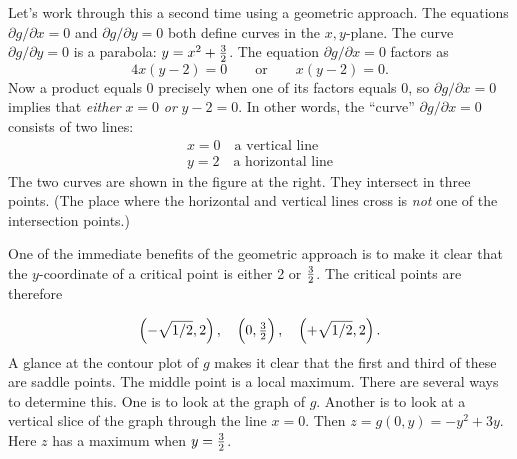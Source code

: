 {{{{        Let's work through this a second time using a geometric approach.  The equations ${\partial g/\partial x} = 0$ and ${\partial g/\partial y} = 0$ both define curves in the $x, y$-plane.  The curve ${\partial g/\partial y} = 0$ is a parabola: $y = x^2 + {\textstyle {3 \over 2}}$.  The equation ${\partial g/\partial x} = 0$ factors as
        \[
4 x ( y - 2) = 0 \qquad \mbox{or} \qquad x ( y - 2 ) = 0.
\]
Now a product equals 0 precisely when one of its factors equals 0, so ${\partial g/\partial x} = 0$ implies that {\em either\/} $x = 0$ {\em or\/} 
$y - 2 = 0$.  In other words, the ``curve'' ${\partial g/\partial x} = 0$ consists of two lines: 
        \[
\begin{array}{l}
        x = 0   \quad \mbox{a vertical line} \\
        y = 2   \quad \mbox{a horizontal line}
        \end{array}
\]
The two curves are shown in the figure at the right.  They intersect in three points.  (The place where the horizontal and vertical lines cross is {\em not\/} one of the intersection points.)
\vspace{3pt}

        One of the immediate benefits of the geometric approach is to make it clear that the $y$-coordinate of a critical point is either 2 or ${3 \over 2}$.  The critical points are therefore

\noindent
\[
\left(-\sqrt{1/2}, 2 \right), \quad
                \left(\vphantom{\sqrt{1/2}}
                        0, {\textstyle {3 \over 2}} \right), \quad
                \left(+\sqrt{1/2}, 2 \right).
\]
A glance at the contour plot of $g$ makes it clear that the first and third of these are saddle points.  The middle point is a local maximum.  There are several ways to determine this.  One is to look at the graph of $g$.  Another is to look at a vertical slice of the graph through the line $x = 0$.  Then $z = g(0, y) = -y^2 + 3y$.  Here $z$ has a maximum when $y = {3 \over 2}$.
        




}}}}

